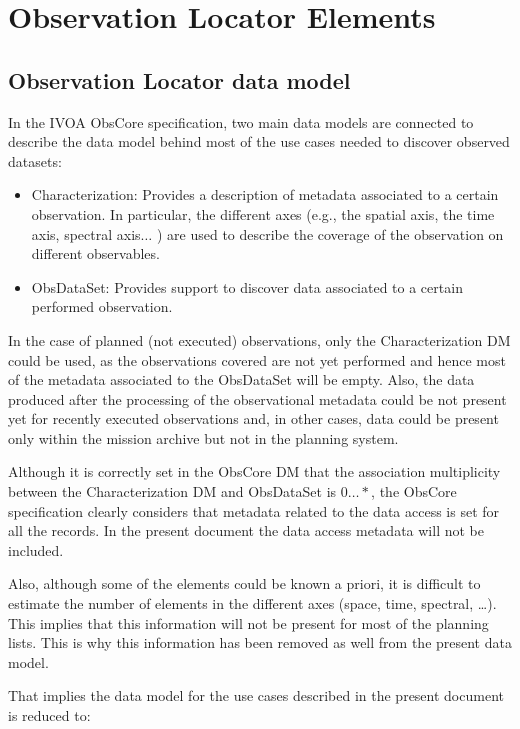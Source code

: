 \documentclass[11pt,a4paper]{ivoa}
\begin{document}
\section{Observation Locator Elements}
\subsection{Observation Locator data model }
In the IVOA ObsCore specification, two main data models are connected to
describe the data model behind most of the use cases needed to discover observed
datasets:

\begin{itemize}
	\item{Characterization: Provides a description of metadata associated to a
  certain observation. In particular, the different axes (e.g., the spatial
  axis, the time axis, spectral axis$ \ldots $ ) are used to describe the
  coverage of the observation on different observables.}

	\item{ObsDataSet: Provides support to discover data associated to a certain
  performed observation.}

\end{itemize}

In the case of planned (not executed) observations, only the Characterization
DM could be used, as the observations covered are not yet performed and hence
most of the metadata associated to the ObsDataSet will be empty. Also, the data
produced after the processing of the observational metadata could be not present
yet for recently executed observations and, in other cases, data could be
present only within the mission archive but not in the planning system.

Although it is correctly set in the ObsCore DM that the association multiplicity
between the Characterization DM and ObsDataSet is $0\ldots\ast$, the ObsCore
specification clearly considers that metadata related to the data access is set
for all the records. In the present document the data access metadata will not
be included.

Also, although some of the elements could be known a priori, it is difficult to
estimate the number of elements in the different axes (space, time, spectral,
\dots).
This implies that this information will not be present for most of the planning
lists. This is why this information has been removed as well from the present
data model.

That implies the data model for the use cases described in the present document
is reduced to:
\end{document}
